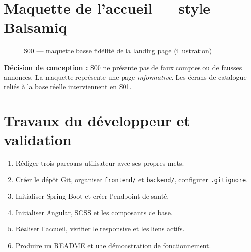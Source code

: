 \section{Maquette de l’accueil --- style Balsamiq}
\begin{figure}[H]\centering\resizebox{\textwidth}{!}{}
\caption{S00 --- maquette basse fidélité de la landing page (illustration)}\label{fig:s00-wire}\end{figure}
\begin{notebox}
\textbf{Décision de conception :} S00 ne présente pas de faux comptes ou de fausses annonces. La maquette représente une page \emph{informative}. Les écrans de catalogue reliés à la base réelle interviennent en S01.
\end{notebox}

\section{Travaux du développeur et validation}
\begin{enumerate}
\item Rédiger trois parcours utilisateur avec ses propres mots.
\item Créer le dépôt Git, organiser \texttt{frontend/} et \texttt{backend/}, configurer \texttt{.gitignore}.
\item Initialiser Spring Boot et créer l’endpoint de santé.
\item Initialiser Angular, SCSS et les composants de base.
\item Réaliser l’accueil, vérifier le responsive et les liens actifs.
\item Produire un README et une démonstration de fonctionnement.
\end{enumerate}
